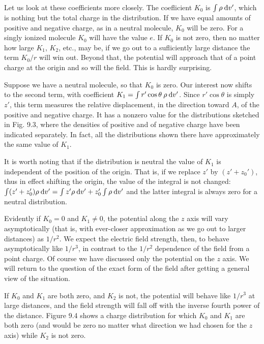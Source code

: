 Let us look at these coefficients more closely. The coeflicient $K_0$
is $\int\rho\:\textup{d} v'$, which is nothing but the total charge in the distribution.
If we have equal amounts of positive and negative charge, as in a
neutral molecule, $K_0$ will be zero. For a singly ionized molecule $K_0$
will have the value $e$. If $K_0$ is not zero, then no matter how large
$K_1$, $K_2$, etc., may be, if we go out to a sufliciently large distance the
term $K_0/ r$ will win out. Beyond that, the potential will approach that
of a point charge at the origin and so will the field. This is hardly
surprising.

Suppose we have a neutral molecule, so that $K_0$ is zero. Our interest
now shifts to the second term, with coefficient $K_1 = \int r'\cos\theta\:\rho\:\textup{d} v'$.
Since $r' \cos \theta$ is simply $z'$, this term measures the relative 
displacement, in the direction toward $A$, of the positive and negative charge.
It has a nonzero value for the distributions sketched in Fig. 9.3, where
the densities of positive and of negative charge have been indicated
separately. In fact, all the distributions shown there have approximately
the same value of $K_1$.

It is worth noting that if the distribution is neutral the value of $K_1$
is independent of the position of the origin. That is, if we replace
$z'$ by $(z' + z_0')$, thus in effect shifting the origin, the value of the integral
is not changed: $\int(z' + z_0')\rho\:\textup{d} v' = \int z'\rho\: \textup{d} v' + z_0'\int\rho\:\textup{d} v'$ and the
latter integral is always zero for a neutral distribution.

Evidently if $K_0 = 0$ and $K_1\ne 0$, the potential along the $z$ axis will
vary asymptotically (that is, with ever-closer approximation as we
go out to larger distances) as $1/r^2$. We expect the electric field
strength, then, to behave asymptotically like $1/r^3$, in contrast to the
$1 /r^2$ dependence of the field from a point charge. Of course we have
discussed only the potential on the $z$ axis. We will return to the question
of the exact form of the field after getting a general view of the
situation.


If $K_0$ and $K_1$ are both zero, and $K_2$ is not, the potential will behave
like $1/r^3$ at large distances, and the field strength will fall off with
the inverse fourth power of the distance. Figure 9.4 shows a charge
distribution for which $K_0$ and $K_1$ are both zero (and would be zero
no matter what direction we had chosen for the $z$ axis) while $K_2$ is
not zero.

